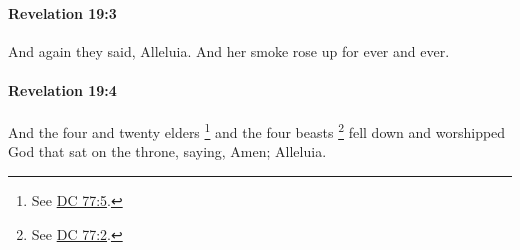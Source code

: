 		\paragraph{Revelation 19:3} %
			\label{REVELATIONNT-19-3}

			And again they said, Alleluia. And her smoke rose up for ever and ever.

			\begin{framed}
			\scriptsize
				\begin{compactdesc}
					\item[SBLG] 
				\end{compactdesc}
			\end{framed}

		\paragraph{Revelation 19:4} %
			\label{REVELATIONNT-19-4}

			And the four and twenty elders%
				\footnote{%
					See \hyperref[DC77-5]{DC 77:5}.
					}
			and the four beasts%
				\footnote{%
					See \hyperref[DC77-2]{DC 77:2}.
					}
			fell down and worshipped God that sat on the throne, saying, Amen; Alleluia.

